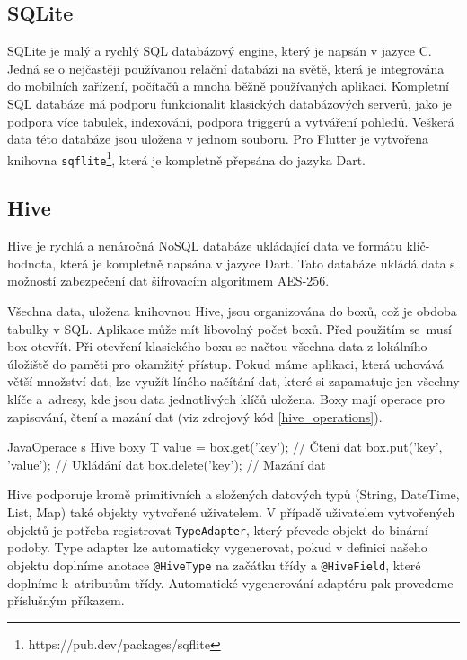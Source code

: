 \documentclass[czech, bc, kiv, he, iso690numb]{fasthesis}
\begin{document}
\subsection{SQLite}\label{SQLite}

SQLite je malý a rychlý \gls{SQL} databázový engine, který je napsán v jazyce C. Jedná se o nejčastěji používanou relační databázi na světě, která je integrována do mobilních zařízení, počítačů a mnoha běžně používaných aplikací. Kompletní \gls{SQL} databáze má podporu funkcionalit klasických databázových serverů, jako je podpora více tabulek, indexování, podpora triggerů a vytváření pohledů. Veškerá data této databáze jsou uložena v jednom souboru. Pro Flutter je vytvořena knihovna \texttt{sqflite}\footnote{https://pub.dev/packages/sqflite}, která je kompletně přepsána do jazyka Dart. \cite{SQLite} \cite{mistrostvi_android} 

\subsection{Hive}\label{Hive}

Hive je rychlá a nenáročná NoSQL databáze ukládající data ve formátu klíč-hodnota, která je kompletně napsána v jazyce Dart. Tato databáze ukládá data s možností zabezpečení dat šifrovacím algoritmem \gls{AES}-256. \cite{Hive_package}

Všechna data, uložena knihovnou Hive, jsou organizována do boxů, což je obdoba tabulky v \gls{SQL}. Aplikace může mít libovolný počet boxů. Před použitím se~musí box otevřít. Při otevření klasického boxu se načtou všechna data z lokálního úložiště do paměti pro okamžitý přístup. Pokud máme aplikaci, která uchovává větší množství dat, lze využít líného načítání dat, které si zapamatuje jen všechny klíče a~adresy, kde jsou data jednotlivých klíčů uložena. Boxy mají operace pro zapisování, čtení a mazání dat (viz zdrojový kód \ref{hive_operations}).  \cite{Hive_documentation}

\begin{code}{Java}{Operace s Hive boxy\label{hive_operations}}
T value = box.get('key');   // Čtení dat
box.put('key', 'value');    // Ukládání dat
box.delete('key');          // Mazání dat
\end{code}

Hive podporuje kromě primitivních a složených datových typů (String, DateTime, List, Map) také objekty vytvořené uživatelem. V případě uživatelem vytvořených objektů je potřeba registrovat \texttt{TypeAdapter}, který převede objekt do binární podoby. Type adapter lze automaticky vygenerovat, pokud v definici našeho objektu doplníme anotace \texttt{@HiveType} na začátku třídy a \texttt{@HiveField}, které doplníme k~atributům třídy. Automatické vygenerování adaptéru pak provedeme příslušným příkazem.
\end{document}
